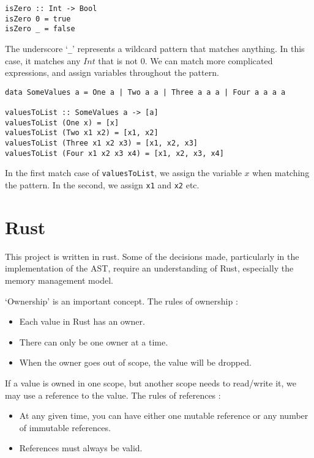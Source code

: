 \begin{verbatim}
isZero :: Int -> Bool
isZero 0 = true
isZero _ = false
\end{verbatim}

\noindent The underscore `\verb|_|' represents a wildcard pattern that matches anything. In this case, it matches any $Int$ that is not $0$. We can match more complicated expressions, and assign variables throughout the pattern.

\begin{verbatim}
data SomeValues a = One a | Two a a | Three a a a | Four a a a a

valuesToList :: SomeValues a -> [a]
valuesToList (One x) = [x]
valuesToList (Two x1 x2) = [x1, x2]
valuesToList (Three x1 x2 x3) = [x1, x2, x3]
valuesToList (Four x1 x2 x3 x4) = [x1, x2, x3, x4]
\end{verbatim}

\noindent In the first match case of \verb|valuesToList|, we assign the variable $x$ when matching the pattern. In the second, we assign \verb|x1| and \verb|x2| etc. 

\section{Rust}
\label{bg:rust}

This project is written in rust.  Some of the decisions made, particularly in the implementation of the AST, require an understanding of Rust, especially the memory management model.

`Ownership' is an important concept. The rules of ownership \cite{rust_book}:
\begin{itemize}
    \item Each value in Rust has an owner.
    \item There can only be one owner at a time.
    \item When the owner goes out of scope, the value will be dropped.
\end{itemize}   

If a value is owned in one scope, but another scope needs to read/write it, we may use a reference to the value. The rules of references \cite{rust_book}:
\begin{itemize}
    \item At any given time, you can have either one mutable reference or any number of immutable references. 
    \item References must always be valid.
\end{itemize}

